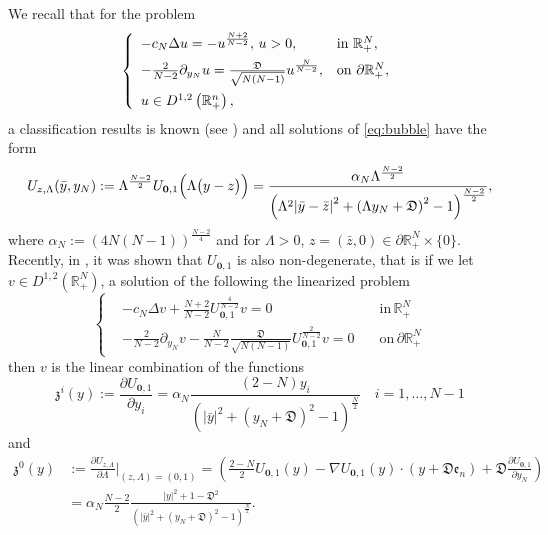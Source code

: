 \documentclass[11pt,a4paper]{amsart}
\begin{document}
We recall that for the problem
\begin{align}\label{eq:bubble}
  \left\{\begin{array}{ll}
  -c_N\Delta u=-u^{\frac{N+2}{N-2}},\,u>0,&\text{in }\mathbb R^N_+ ,\vspace{5pt}\\-\frac2{N-2}\partial_{y_N}u=\frac{\mathfrak{D}}{\sqrt{N(N-1)}} u^{\frac N{N-2}},&\text{on }\partial\mathbb R^N_+,\vspace{5pt} \\
  u \in D^{1,2}\left(\mathbb{R}_{+}^{n}\right),&
  \end{array}\right.
  \end{align}
a classification results is known (see \cite{ChipotShafrirFila_1996}) and all solutions of \eqref{eq:bubble} have the form
\begin{align}\label{eq.bubble_form}
  \begin{aligned}
    &U_{z,\Lambda}(\bar y,y_N):=\Lambda^{\frac{N-2}2}U_{\mathbf 0,1}\Bigl(\Lambda \bigl(y-z\bigr)\Bigr)=\frac{\alpha_N\Lambda^{\frac{N-2}{2}}}{{\left({\Lambda^2|\bar{y}-\bar{z}|}^2+{(\Lambda y_N+ \mathfrak{D})}^2 - 1\right)}^{\frac{N-2}{2}}},\\
\end{aligned}
\end{align}
where $\alpha_N:=({4N(N-1)})^{\frac{N-2}{4}}$ and for $\Lambda>0$, $z=(\bar z,0)\in\partial\mathbb R^N_+\times\{0\}$.\\ Recently, in \cite{Cruz-BlazquezPistoiaVaira_2022}, it was shown that $U_{\mathbf 0,1}$ is also non-degenerate, that is if we let $v\in D^{1, 2}(\mathbb R^N_+)$, a solution of the following the linearized problem 
\begin{equation}\label{lblin}
\left\{\begin{aligned}&-c_N\Delta v+\frac{N+2}{N-2}U_{\mathbf 0,1}^{\frac{4}{N-2}}v  =0\quad& \mbox{in}\, \mathbb R^{N}_+\\
&-\frac{2}{N-2}\partial_{y_N}v-\frac{N}{N-2}\frac{\mathfrak{D}}{\sqrt{N(N-1)}}U_{\mathbf 0,1}^{\frac{2}{N-2}}v=0
\quad &\mbox{on}\, \partial\mathbb R^N_+\end{aligned}\right.\end{equation}
 then $v$ is the linear combination of the functions 
\begin{equation}\label{zi}
\mathfrak z^i(y):=\frac{\partial U_{\mathbf 0,1}}{\partial y_i}=\alpha_N\frac{(2-N)y_i}{\left(|\bar y|^2+(y_N+\mathfrak D)^2-1\right)^{\frac N 2}}\quad i=1, \ldots, N-1\end{equation}
and
\begin{equation}\label{zn}\begin{aligned}
\mathfrak z^0(y)&:=\frac{\partial U_{z,\Lambda}}{\partial \Lambda }{\Big|_{(z, \Lambda)=(0, 1 )}}=\left(\frac{2-N}{2} U_{\mathbf 0,1}(y)-\nabla U_{\mathbf 0,1}(y)\cdot (y+\mathfrak D \mathfrak e_n)+\mathfrak D\frac{\partial U_{\mathbf 0,1}}{\partial y_N}\right)\\
&=\alpha_N\frac{N-2}{2}\frac{|y|^2+1-\mathfrak D^2}{\left(|\bar y|^2+(y_N+\mathfrak D)^2-1\right)^{\frac N 2}}.\end{aligned}\end{equation}
\end{document}
